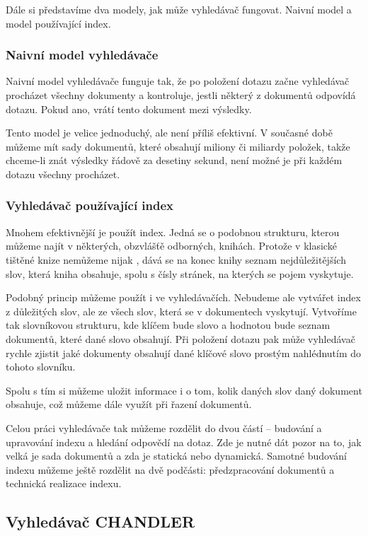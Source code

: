 \documentclass[12pt]{article}
\newcommand{\name}{CHANDLER}
\begin{document}
Dále si představíme dva modely, jak může vyhledávač fungovat. Naivní model a model používající index.

\subsubsection{Naivní model vyhledávače}

Naivní model vyhledávače funguje tak, že po položení dotazu začne vyhledávač procházet všechny dokumenty a kontroluje, jestli některý z dokumentů odpovídá dotazu. Pokud ano, vrátí tento dokument mezi výsledky. 

Tento model je velice jednoduchý, ale není příliš efektivní. V současné době můžeme mít sady dokumentů, které obsahují miliony či miliardy položek, takže chceme-li znát výsledky řádově za desetiny sekund, není možné je při každém dotazu všechny procházet.

\subsubsection{Vyhledávač používající index}
Mnohem efektivnější je použít index. Jedná se o podobnou strukturu, kterou můžeme najít v některých, obzvlášťě odborných, knihách. Protože v klasické tištěné knize nemůžeme nijak , dává se na konec knihy seznam nejdůležitějších slov, která kniha obsahuje, spolu s čísly stránek, na kterých se pojem vyskytuje. 

Podobný princip můžeme použít i ve vyhledávačích. Nebudeme ale vytvářet index z důležitých slov, ale ze všech slov, která se v dokumentech vyskytují. Vytvoříme tak slovníkovou strukturu, kde klíčem bude slovo a hodnotou bude seznam dokumentů, které dané slovo obsahují. Při položení dotazu pak může vyhledávač rychle zjistit jaké dokumenty obsahují dané klíčové slovo prostým nahlédnutím do tohoto slovníku. 

Spolu s tím si můžeme uložit informace i o tom, kolik daných slov daný dokument obsahuje, což můžeme dále využít při řazení dokumentů. 

Celou práci vyhledávače tak můžeme rozdělit do dvou částí -- budování a upravování indexu a hledání odpovědí na dotaz. Zde je nutné dát pozor na to, jak velká je sada dokumentů a zda je statická nebo dynamická. Samotné budování indexu můžeme ještě rozdělit na dvě podčásti: předzpracování dokumentů a technická realizace indexu. 

\subsection{Vyhledávač \name}
\end{document}
